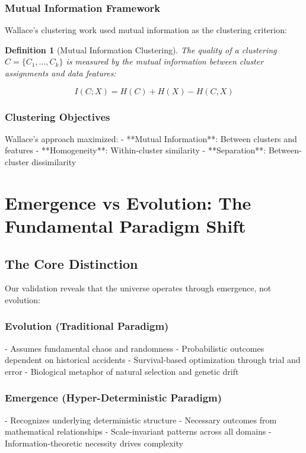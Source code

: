 \documentclass[12pt]{article}
\newtheorem{definition}{Definition}
\begin{document}
\subsubsection{Mutual Information Framework}

Wallace's clustering work used mutual information as the clustering criterion:

\begin{definition}[Mutual Information Clustering]
The quality of a clustering $C = \{C_1, ..., C_k\}$ is measured by the mutual information between cluster assignments and data features:

\begin{equation}
I(C; X) = H(C) + H(X) - H(C,X)
\end{equation}
\end{definition}

\subsubsection{Clustering Objectives}

Wallace's approach maximized:
- **Mutual Information**: Between clusters and features
- **Homogeneity**: Within-cluster similarity
- **Separation**: Between-cluster dissimilarity

\section{Emergence vs Evolution: The Fundamental Paradigm Shift}

\subsection{The Core Distinction}

Our validation reveals that the universe operates through emergence, not evolution:

\subsubsection{Evolution (Traditional Paradigm)}
- Assumes fundamental chaos and randomness
- Probabilistic outcomes dependent on historical accidents
- Survival-based optimization through trial and error
- Biological metaphor of natural selection and genetic drift

\subsubsection{Emergence (Hyper-Deterministic Paradigm)}
- Recognizes underlying deterministic structure
- Necessary outcomes from mathematical relationships
- Scale-invariant patterns across all domains
- Information-theoretic necessity drives complexity
\end{document}
